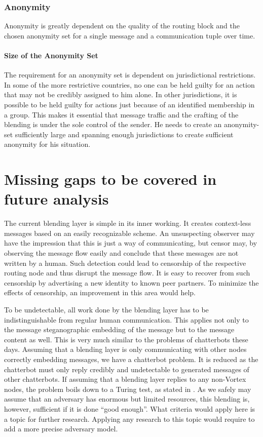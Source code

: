 \subsection{Anonymity}
Anonymity is greatly dependent on the quality of the routing block and the chosen anonymity set for a single message and a communication tuple over time. 

\subsubsection{Size of the Anonymity Set}
The requirement for an anonymity set is dependent on jurisdictional restrictions. In some of the more restrictive countries, no one can be held guilty for an action that may not be credibly assigned to him alone. In other jurisdictions, it is possible to be held guilty for actions just because of an identified membership in a group. This makes it essential that message traffic and the crafting of the blending is under the sole control of the sender. He needs to create an anonymity-set sufficiently large and spanning enough jurisdictions to create sufficient anonymity for his situation.

\chapter{Missing gaps to be covered in future analysis}
The current blending layer is simple in its inner working. It creates context-less messages based on an easily recognizable scheme. An unsuspecting observer may have the impression that this is just a way of communicating, but censor may, by observing the message flow easily and conclude that these messages are not written by a human. Such detection could lead to censorship of the respective routing node and thus disrupt the message flow. It is easy to recover from such censorship by advertising a new identity to known peer partners. To minimize the effects of censorship, an improvement in this area would help.

To be undetectable, all work done by the blending layer has to be indistinguishable from regular human communication. This applies not only to the message steganographic embedding of the message but to the message content as well. This is very much similar to the problems of chatterbots these days. Assuming that a blending layer is only communicating with other nodes correctly embedding messages, we have a chatterbot problem. It is reduced as the chatterbot must only reply credibly and undetectable to generated messages of other chatterbots. If assuming that a blending layer replies to any non-Vortex nodes, the problem boils down to a Turing test, as stated in \cite{turing1950computing}. As we safely may assume that an adversary has enormous but limited resources, this blending is, however, sufficient if it is done ``good enough''. What criteria would apply here is a topic for further research. Applying any research to this topic would require to add a more precise adversary model.

